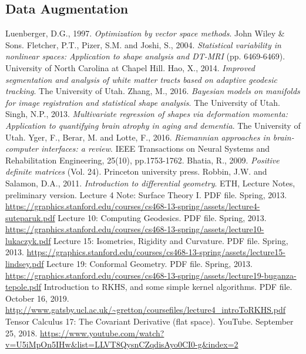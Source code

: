 \documentclass[a4paper]{article}
\theoremstyle{definition}
\theoremstyle{plain}
\begin{document}
\subsection{Data Augmentation}

\newpage
\begin{thebibliography}{99} 
Luenberger, D.G., 1997. \textit{Optimization by vector space methods}. John Wiley \& Sons.
Fletcher, P.T., Pizer, S.M. and Joshi, S., 2004. \textit{Statistical variability in nonlinear spaces: Application to shape analysis and DT-MRI} (pp. 6469-6469). University of North Carolina at Chapel Hill.
Hao, X., 2014. \textit{Improved segmentation and analysis of white matter tracts based on adaptive geodesic tracking}. The University of Utah.
Zhang, M., 2016. \textit{Bayesian models on manifolds for image registration and statistical shape analysis}. The University of Utah.
Singh, N.P., 2013. \textit{Multivariate regression of shapes via deformation momenta: Application to quantifying brain atrophy in aging and dementia}. The University of Utah.
Yger, F., Berar, M. and Lotte, F., 2016. \textit{Riemannian approaches in brain-computer interfaces: a review}. IEEE Transactions on Neural Systems and Rehabilitation Engineering, 25(10), pp.1753-1762.
Bhatia, R., 2009. \textit{Positive definite matrices} (Vol. 24). Princeton university press.
Robbin, J.W. and Salamon, D.A., 2011. \textit{Introduction to differential geometry}. ETH, Lecture Notes, preliminary version.
 Lecture 4 Note: Surface Theory I. PDF file. Spring, 2013. \url{https://graphics.stanford.edu/courses/cs468-13-spring/assets/lecture4-suteparuk.pdf}
 Lecture 10: Computing Geodesics. PDF file. Spring, 2013. \url{https://graphics.stanford.edu/courses/cs468-13-spring/assets/lecture10-lukaczyk.pdf}
 Lecture 15: Isometries, Rigidity and Curvature. PDF file. Spring, 2013. \url{https://graphics.stanford.edu/courses/cs468-13-spring/assets/lecture15-lindsey.pdf}
 Lecture 19: Conformal Geometry. PDF file. Spring, 2013. \url{https://graphics.stanford.edu/courses/cs468-13-spring/assets/lecture19-buganza-tepole.pdf}
 Introduction to RKHS, and some simple kernel
algorithms. PDF file. October 16, 2019. \url{http://www.gatsby.ucl.ac.uk/~gretton/coursefiles/lecture4_introToRKHS.pdf}
 Tensor Calculus 17: The Covariant Derivative (flat space). YouTube. September 25, 2018. \url{https://www.youtube.com/watch?v=U5iMpOn5IHw&list=LLVT8QysnCZqdisAyo0CI0-g&index=2}

\end{thebibliography}
\end{document}
